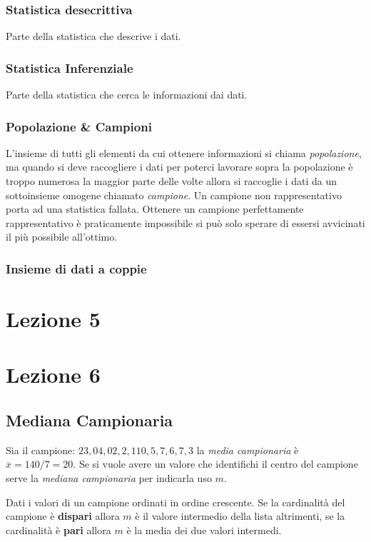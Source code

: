\documentclass{article}
\begin{document}
\subsubsection*{Statistica desecrittiva}
Parte della statistica che descrive i dati.

\subsubsection*{Statistica Inferenziale}
Parte della statistica che cerca le informazioni dai dati.

\subsubsection*{Popolazione \& Campioni}
L'insieme di tutti gli elementi da cui ottenere informazioni si chiama \textit{popolazione}, ma quando si deve raccogliere i dati per poterci lavorare sopra la popolazione è troppo numerosa la maggior parte delle volte allora si raccoglie i dati da un sottoinsieme omogene chiamato \textit{campione}. Un campione non rappresentativo porta ad una statistica fallata. Ottenere un campione perfettamente rappresentativo è praticamente impossibile si può solo sperare di essersi avvicinati il più possibile all'ottimo.

\subsubsection*{Insieme di dati a coppie}



\section*{Lezione 5}

\section*{Lezione 6}

\subsection*{Mediana Campionaria}

Sia il campione: $23,04,02,2,110,5,7,6,7,3$ la \textit{media campionaria} è $\overline{x} = 140/7=20$. Se si vuole avere un valore che identifichi il centro del campione serve la \textit{mediana campionaria} per indicarla uso $m$.

\begin{tcolorbox}
 Dati i valori di un campione ordinati in ordine crescente. Se la cardinalità del campione è \textbf{dispari} allora $m$ è il valore intermedio della lista altrimenti, se la cardinalità è \textbf{pari} allora $m$ è la media dei due valori intermedi.  
\end{tcolorbox}
\end{document}
